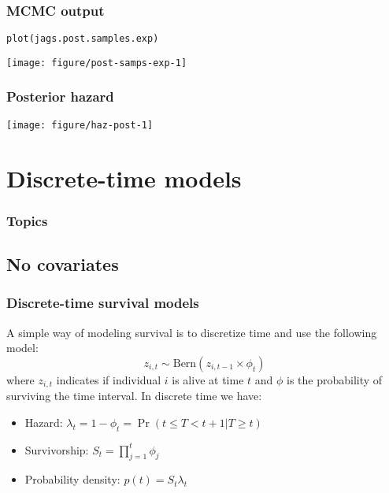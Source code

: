 \documentclass[color=usenames,dvipsnames]{beamer}\usepackage[]{graphicx}\usepackage[]{xcolor}
\makeatletter
\newcommand{\hldef}[1]{\textcolor[rgb]{0,0,0}{#1}}%
\newcommand{\hlkwd}[1]{\textcolor[rgb]{0.004,0.004,0.506}{#1}}%
\newenvironment{kframe}{%
 \def\at@end@of@kframe{}%
 \ifinner\ifhmode%
  \def\at@end@of@kframe{\end{minipage}}%
  \begin{minipage}{\columnwidth}%
 \fi\fi%
 \def\FrameCommand##1{\hskip\@totalleftmargin \hskip-\fboxsep
 \colorbox{shadecolor}{##1}\hskip-\fboxsep
     \hskip-\linewidth \hskip-\@totalleftmargin \hskip\columnwidth}%
 \MakeFramed {\advance\hsize-\width
   \@totalleftmargin\z@ \linewidth\hsize
   \@setminipage}}%
 {\par\unskip\endMakeFramed%
 \at@end@of@kframe}
\newenvironment{knitrout}{}{} %
\makeatother
\begin{document}
\begin{frame}[fragile]
  \frametitle{MCMC output}
\begin{knitrout}
\color{fgcolor}\begin{kframe}
\begin{alltt}
\hlkwd{plot}\hldef{(jags.post.samples.exp)}
\end{alltt}
\end{kframe}

{\centering \texttt{[image: figure/post-samps-exp-1]} 

}


\end{knitrout}
\end{frame}


\begin{frame}[fragile]
  \frametitle{Posterior hazard}
\begin{knitrout}
\color{fgcolor}

{\centering \texttt{[image: figure/haz-post-1]} 

}


\end{knitrout}
\end{frame}



\section{Discrete-time models}



\begin{frame}[plain]
  \frametitle{Topics}
  \Large
  \tableofcontents[currentsection]
\end{frame}

\subsection{No covariates}


\begin{frame}
  \frametitle{Discrete-time survival models}
  A simple way of modeling survival is to discretize time and use the
  following model:
  \[
    z_{i,t} \sim \mathrm{Bern}(z_{i,t-1}\times \phi_t)
  \]
  where $z_{i,t}$ indicates if individual $i$ is alive at time $t$ and
  $\phi$ is the probability of surviving the time interval.
  \pause
  \vfill
  In discrete time we have:
  \begin{itemize}
    \item Hazard: $\lambda_t = 1-\phi_t = \Pr(t \le T < t+1 | T\ge t)$
    \item Survivorship: $S_t = \prod_{j=1}^t \phi_j$
    \item Probability density: $p(t) = S_t \lambda_t$
  \end{itemize}
\end{frame}
\end{document}
